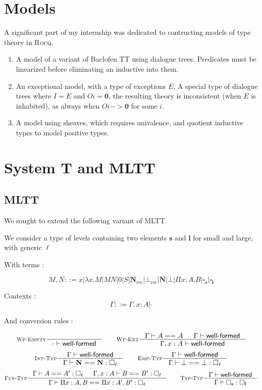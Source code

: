 \documentclass{article}
\DeclareMathOperator{\rec}{rec}
\newcommand{\0}{\mathbf{0}}
\newcommand{\1}{\mathbf{1}}
\newcommand{\nat}{\mathbf{N}}
\newcommand{\Wf}{\textsf{well-formed}}
\newcommand{\slvl}{\mathbf{s}}
\newcommand{\llvl}{\mathbf{l}}
\begin{document}
\section{Models}

A significant part of my internship was dedicated to contructing models of type theory in \textsc{Rocq}.

\begin{enumerate}
    \item A model of a variant of Baclofen TT using dialogue trees. Predicates must be linearized before eliminating an inductive into them.
    \item An exceptional model, with a type of exceptions $E$. A special type of dialogue trees where $I = E$ and $O i = \mathbf{0}$, the resulting theory is inconsistent (when $E$ is inhabited), as always when $O i -> \mathbf{0}$ for some $i$.
    \item A model using sheaves, which requires univalence, and quotient inductive types to model positive types.
\end{enumerate}


\section{System T and MLTT}
\subsection{MLTT}
We sought to extend the following variant of MLTT.

We consider a type of levels containing two elements $\slvl$ and $\llvl$ for small and large, with generic $\ell$

With terms :

$$ M,N ::= x | \lambda x. M | MN | 0 | S | \nat_{\rec} | \bot_{\rec} | \nat | \bot | \Pi x :A.B | \square_\slvl | \square_\llvl$$


Contexts :
$$ \Gamma ::= \Gamma, x : A | \cdot $$

And conversion rules :

$$
    \inference[\textsc{Wf-Empty}]{}{\cdot |- \Wf} \qquad
    \inference[\textsc{Wf-Ext}]{\Gamma |- A == A & \Gamma |- \Wf}{ \Gamma, x : A |- \Wf}
$$
$$
    \inference[\textsc{Int-Typ}]{\Gamma |- \Wf}{\Gamma |- \nat == \nat : \square_\ell} \qquad
    \inference[\textsc{Emp-Typ}]{\Gamma |- \Wf}{\Gamma |- \bot == \bot : \square_\ell}
$$
$$
    \inference[\textsc{Fun-Typ}]{\Gamma |- A == A' : \square_\ell & \Gamma, x : A |- B == B' : \square_\ell}{\Gamma |- \Pi x  : A, B == \Pi x: A', B' : \square_\ell} \qquad
    \inference[\textsc{Typ-Typ}]{\Gamma |- \Wf}{\Gamma |- \square_\slvl : \square_\llvl}
$$
\end{document}

